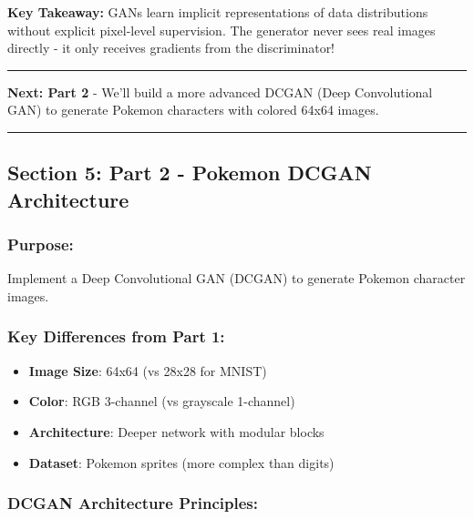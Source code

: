 \documentclass[11pt]{article}
\providecommand{\tightlist}{%
      \setlength{\itemsep}{0pt}\setlength{\parskip}{0pt}}
\begin{document}
\textbf{Key Takeaway:} GANs learn implicit representations of data
distributions without explicit pixel-level supervision. The generator
never sees real images directly - it only receives gradients from the
discriminator!

\begin{center}\rule{0.5\linewidth}{0.5pt}\end{center}

\textbf{Next: Part 2} - We'll build a more advanced DCGAN (Deep
Convolutional GAN) to generate Pokemon characters with colored 64x64
images.

    \begin{center}\rule{0.5\linewidth}{0.5pt}\end{center}

\subsection{Section 5: Part 2 - Pokemon DCGAN
Architecture}\label{section-5-part-2---pokemon-dcgan-architecture}

\subsubsection{Purpose:}\label{purpose}

Implement a Deep Convolutional GAN (DCGAN) to generate Pokemon character
images.

\subsubsection{Key Differences from Part
1:}\label{key-differences-from-part-1}

\begin{itemize}
\tightlist
\item
  \textbf{Image Size}: 64x64 (vs 28x28 for MNIST)
\item
  \textbf{Color}: RGB 3-channel (vs grayscale 1-channel)
\item
  \textbf{Architecture}: Deeper network with modular blocks
\item
  \textbf{Dataset}: Pokemon sprites (more complex than digits)
\end{itemize}

\subsubsection{DCGAN Architecture
Principles:}\label{dcgan-architecture-principles}
\end{document}
